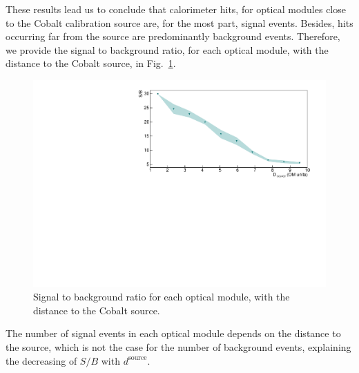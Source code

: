 These results lead us to conclude that calorimeter hits, for optical modules close to the Cobalt calibration source are, for the most part, signal events.
Besides, hits occurring far from the source are predominantly background events.
Therefore, we provide the signal to background ratio, for each optical module, with the distance to the Cobalt source, in Fig.~\ref{fig:Co_ratioSB}.
\begin{figure}[h]
  \centering
  \includegraphics[width=1.1\textwidth]{commissioning/fig_commissioning/Co_ratioSB_distance.pdf}
  \caption{Signal to background ratio for each optical module, with the distance to the Cobalt source.
    \label{fig:Co_ratioSB}}
\end{figure}
The number of signal events in each optical module depends on the distance to the source, which is not the case for the number of background events, explaining the decreasing of $S/B$ with $d^{\text{source}}$.




